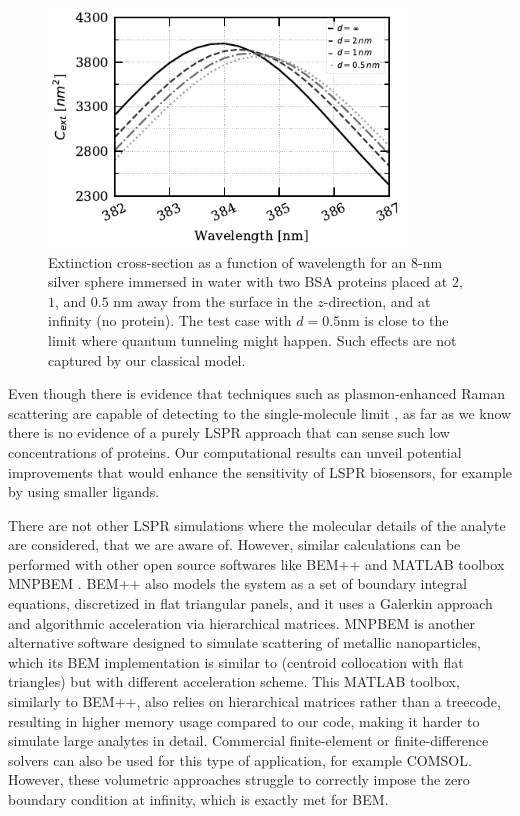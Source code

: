 \begin{figure}%
    \centering
    \includegraphics[width=0.85\textwidth]{2pz_lspr_response.pdf} 
    \caption{Extinction cross-section as a function of wavelength for an $8$-nm
             silver sphere immersed in water with two BSA proteins placed at
             $2$, $1$, and $0.5$ nm away from the surface in the 
             $z$-direction, and at infinity (no protein). The test case with
             $d=0.5$nm is close to the limit where quantum tunneling might happen. 
             Such effects are not captured by our classical model.}
    \label{fig:dist_response}
 \end{figure}

Even though there is evidence that techniques such as plasmon-enhanced Raman 
scattering are capable of detecting to the single-molecule limit 
\cite{ZhangZhangETal2013}, as far as we know there is no evidence of a purely
LSPR approach that can sense such low concentrations of proteins. Our 
computational results can unveil potential improvements that would enhance 
the sensitivity of LSPR biosensors, for example by using smaller ligands. 

There are not other LSPR simulations where the molecular details of the analyte 
are considered, that we are aware of. However, similar calculations can be 
performed with other open source softwares like BEM++ \cite{SmigajETal2015} and 
MATLAB toolbox MNPBEM \cite{HohenesterTrugler2012}. BEM++ also models the system
as a set of boundary integral equations, discretized in flat triangular panels, 
and it uses a Galerkin approach and algorithmic acceleration via hierarchical 
matrices. MNPBEM is another alternative software designed to simulate scattering
of metallic nanoparticles, which its BEM implementation is similar to \pygbe 
(centroid collocation with flat triangles) but with different acceleration scheme.
This MATLAB toolbox, similarly to BEM++, also relies on hierarchical matrices 
rather than a treecode, resulting in higher memory usage compared to our code, 
making it harder to simulate large analytes in detail. 
Commercial finite-element or finite-difference solvers can also be used for this
type of application, for example COMSOL. However, these volumetric approaches 
struggle to correctly impose the zero boundary condition at infinity, which is
exactly met for BEM.  

